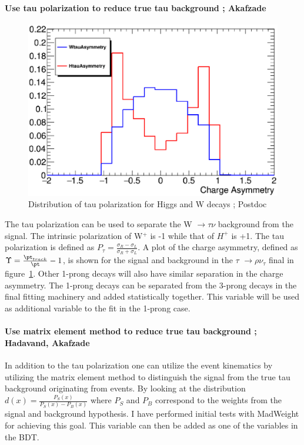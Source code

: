 \documentclass[11pt]{article}
\newcommand{\too}{$\rightarrow$}
\begin{document}
\paragraph{Use tau polarization to reduce true tau background ; Akafzade}
\begin{figure}\label{fig:plot1}
\begin{center}
\includegraphics[height=0.32\textwidth]{tauAsy.eps}
\caption{Distribution of tau polarization for Higgs and W decays ;  Postdoc}
\label{fig:tau}
\end{center}
\end{figure}
The tau polarization can be used to separate the W \too $\tau \nu$ background from the signal.  The intrinsic polarization of W$^+$ is -1 while that of $H^+$ is +1.  The tau polarization is defined as $P_{\tau}=\frac{\sigma_R - \sigma_L}{\sigma_R + \sigma_L}$.
A plot of the charge asymmetry, defined as $\Upsilon=\frac{\pt_{track}}{\pt} - 1$, is shown for the signal and background in the $\tau$ \too $\rho \nu_{\tau}$ final in figure~\ref{fig:tau}. Other 1-prong decays will also have similar separation in the charge asymmetry. 
The 1-prong decays can be separated from the 3-prong decays in the final fitting machinery and added statistically together.  This variable will be used as additional variable to the fit in the 1-prong case.

\paragraph{Use matrix element method to reduce true tau background ;  Hadavand, Akafzade}
In addition to the tau polarization one can utilize the event kinematics by utilizing the matrix element method to distinguish the signal from the true tau background originating from \ttbar events.  
By looking at the distribution $d(x)=\frac{P_S(x)}{P_S(x)-P_B(x)}$ where $P_S$ and $P_B$ correspond to the weights from the signal and background 
hypothesis. I have performed initial tests with MadWeight for achieving this goal. This variable can then be added as one of the variables in the BDT. 
\end{document}
